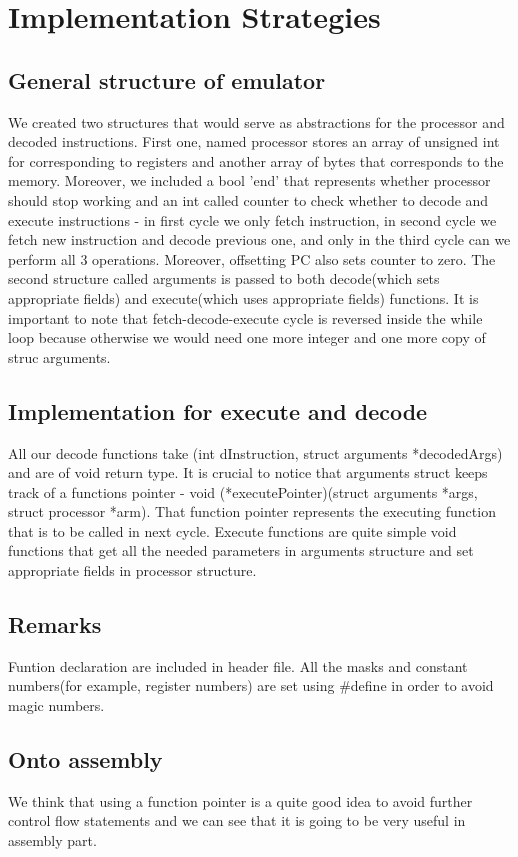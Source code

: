 \documentclass[11pt]{article}
\begin{document}
	


\section{Implementation Strategies}
	\subsection{General structure of emulator}
	We created two structures that would serve as abstractions for the processor and decoded instructions. First one, named processor stores an array of unsigned int for corresponding to registers and another array of bytes that corresponds to the memory. Moreover, we included a bool 'end' that represents whether processor should stop working and an int called counter to check whether to decode and execute instructions - in first cycle we only fetch instruction, in second cycle we fetch new instruction and decode previous one, and only in the third cycle can we perform all 3 operations. Moreover, offsetting PC also sets counter to zero. The second structure called arguments is passed to both decode(which sets appropriate fields) and execute(which uses appropriate fields) functions. It is important to note that fetch-decode-execute cycle is reversed inside the while loop because otherwise we would need one more integer and one more copy of struc arguments.  
	 \subsection{Implementation for execute and decode}
	 All our decode functions  take (int dInstruction, struct arguments *decodedArgs) and are of void return type. It is crucial to notice that arguments struct keeps track of a functions pointer  - void (*executePointer)(struct arguments *args, struct processor *arm). That function pointer represents the executing function that is to be called in next cycle. Execute functions are quite simple void functions that get all the needed parameters in arguments structure and set appropriate fields in processor structure.
	\subsection{Remarks}
	Funtion declaration are included in header file. All the masks and constant numbers(for example, register numbers) are set using #define in order to avoid magic numbers. 
	\subsection{Onto assembly}
	We think that using a function pointer is a quite good idea to avoid further control flow statements and we can see that it is going to be very useful in assembly part.
\end{document}
